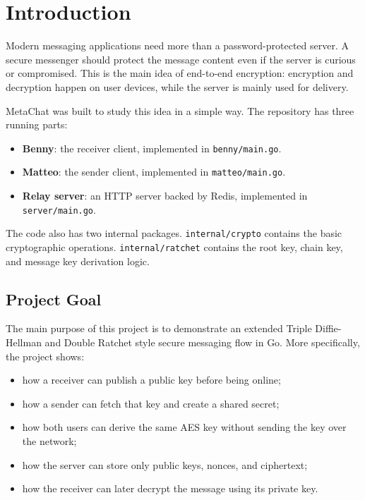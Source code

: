 \documentclass[12pt,a4paper]{article}
\begin{document}
\section{Introduction}

Modern messaging applications need more than a password-protected server. A secure messenger should protect the message content even if the server is curious or compromised. This is the main idea of end-to-end encryption: encryption and decryption happen on user devices, while the server is mainly used for delivery.

MetaChat was built to study this idea in a simple way. The repository has three running parts:

\begin{itemize}
    \item \textbf{Benny}: the receiver client, implemented in \texttt{benny/main.go}.
    \item \textbf{Matteo}: the sender client, implemented in \texttt{matteo/main.go}.
    \item \textbf{Relay server}: an HTTP server backed by Redis, implemented in \texttt{server/main.go}.
\end{itemize}

The code also has two internal packages. \texttt{internal/crypto} contains the basic cryptographic operations. \texttt{internal/ratchet} contains the root key, chain key, and message key derivation logic.

\subsection{Project Goal}

The main purpose of this project is to demonstrate an extended Triple Diffie-Hellman and Double Ratchet style secure messaging flow in Go. More specifically, the project shows:

\begin{itemize}
    \item how a receiver can publish a public key before being online;
    \item how a sender can fetch that key and create a shared secret;
    \item how both users can derive the same AES key without sending the key over the network;
    \item how the server can store only public keys, nonces, and ciphertext;
    \item how the receiver can later decrypt the message using its private key.
\end{itemize}
\end{document}
